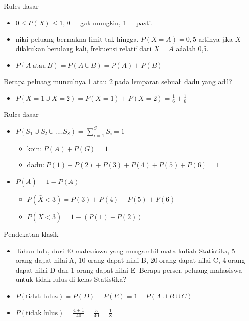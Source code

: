 \documentclass[
  ignorenonframetext,
]{beamer}
\providecommand{\tightlist}{%
  \setlength{\itemsep}{0pt}\setlength{\parskip}{0pt}}\usepackage{longtable,booktabs,array}
\begin{document}
\begin{frame}{Rules dasar}
\label{rules-dasar}
\begin{itemize}
\item
  \(0 \leq P(X) \leq 1\), 0 = gak mungkin, 1 = pasti.
\item
  nilai peluang bermakna limit tak hingga. \(P(X=A)=0,5\) artinya jika
  \(X\) dilakukan berulang kali, frekuensi relatif dari \(X=A\) adalah
  0,5.
\item
  \(P(A \ \text{atau} \ B) = P(A \cup B)=P(A)+P(B)\)
\end{itemize}

Berapa peluang munculnya 1 atau 2 pada lemparan sebuah dadu yang adil?

\begin{itemize}[<+->]
\tightlist
\item
  \(P(X=1 \cup X=2)=P(X=1)+P(X=2)=\frac{1}{6}+\frac{1}{6}\)
\end{itemize}
\end{frame}

\begin{frame}{Rules dasar}
\label{rules-dasar-1}
\begin{itemize}[<+->]
\item
  \(P(S_1 \cup S_2 \cup .... S_S)=\sum_{i=1}^S S_i=1\)

  \begin{itemize}[<+->]
  \item
    koin: \(P(A)+P(G)=1\)
  \item
    dadu: \(P(1)+P(2)+P(3)+P(4)+P(5)+P(6)=1\)
  \end{itemize}
\item
  \(P(\bar{A})=1-P(A)\)

  \begin{itemize}[<+->]
  \item
    \(P(\bar{X}<3)=P(3)+P(4)+P(5)+P(6)\)
  \item
    \(P(\bar{X}<3)=1-\left(P(1)+P(2) \right)\)
  \end{itemize}
\end{itemize}
\end{frame}

\begin{frame}{Pendekatan klasik}
\label{pendekatan-klasik}
\begin{itemize}[<+->]
\item
  Tahun lalu, dari 40 mahasiswa yang mengambil mata kuliah Statistika, 5
  orang dapat nilai A, 10 orang dapat nilai B, 20 orang dapat nilai C, 4
  orang dapat nilai D dan 1 orang dapat nilai E. Berapa persen peluang
  mahasiswa untuk tidak lulus di kelas Statistika?
\item
  \(P(\text{tidak lulus})=P(D)+P(E)=1-P(A \cup B \cup C)\)
\item
  \(P(\text{tidak lulus})=\frac{4+1}{40}=\frac{5}{40}=\frac{1}{8}\)
\end{itemize}
\end{frame}
\end{document}
